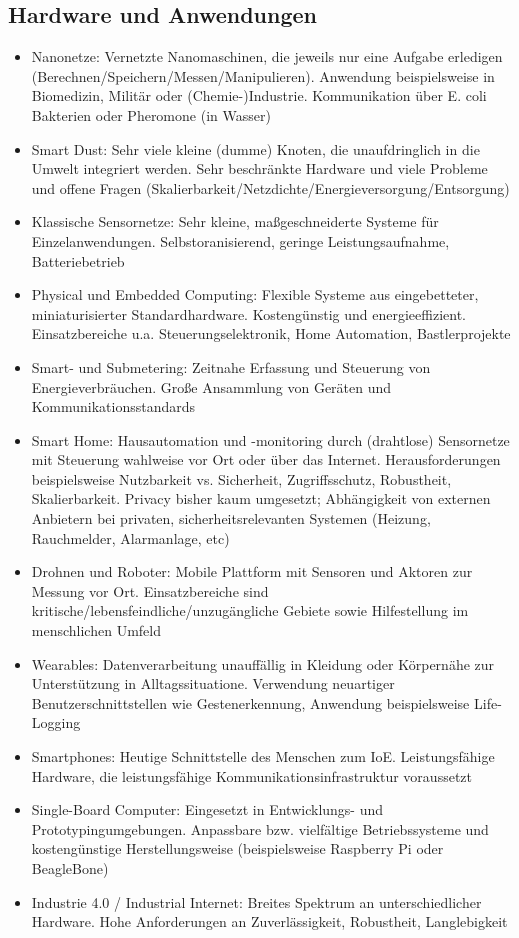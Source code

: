 \subsection{Hardware und Anwendungen}
\begin{itemize}
	\item Nanonetze: Vernetzte Nanomaschinen, die jeweils nur eine Aufgabe erledigen (Berechnen/Speichern/Messen/Manipulieren). Anwendung beispielsweise in Biomedizin, Militär oder (Chemie-)Industrie. Kommunikation über E. coli Bakterien oder Pheromone (in Wasser)
	\item Smart Dust: Sehr viele kleine (dumme) Knoten, die unaufdringlich in die Umwelt integriert werden. Sehr beschränkte Hardware und viele Probleme und offene Fragen (Skalierbarkeit/Netzdichte/Energieversorgung/Entsorgung)
	\item Klassische Sensornetze: Sehr kleine, maßgeschneiderte Systeme für Einzelanwendungen. Selbstoranisierend, geringe Leistungsaufnahme, Batteriebetrieb
	\item Physical und Embedded Computing: Flexible Systeme aus eingebetteter, miniaturisierter Standardhardware. Kostengünstig und energieeffizient. Einsatzbereiche u.a. Steuerungselektronik, Home Automation, Bastlerprojekte
	\item Smart- und Submetering: Zeitnahe Erfassung und Steuerung von Energieverbräuchen. Große Ansammlung von Geräten und Kommunikationsstandards
	\item Smart Home: Hausautomation und -monitoring durch (drahtlose) Sensornetze mit Steuerung wahlweise vor Ort oder über das Internet. Herausforderungen beispielsweise Nutzbarkeit vs. Sicherheit, Zugriffsschutz, Robustheit, Skalierbarkeit. Privacy bisher kaum umgesetzt; Abhängigkeit von externen Anbietern bei privaten, sicherheitsrelevanten Systemen (Heizung, Rauchmelder, Alarmanlage, etc)
	\item Drohnen und Roboter: Mobile Plattform mit Sensoren und Aktoren zur Messung vor Ort. Einsatzbereiche sind kritische/lebensfeindliche/unzugängliche Gebiete sowie Hilfestellung im menschlichen Umfeld
	\item Wearables: Datenverarbeitung unauffällig in Kleidung oder Körpernähe zur Unterstützung in Alltagssituatione. Verwendung neuartiger Benutzerschnittstellen wie Gestenerkennung, Anwendung beispielsweise Life-Logging
	\item Smartphones: Heutige Schnittstelle des Menschen zum IoE. Leistungsfähige Hardware, die leistungsfähige Kommunikationsinfrastruktur voraussetzt
	\item Single-Board Computer: Eingesetzt in Entwicklungs- und Prototypingumgebungen. Anpassbare bzw. vielfältige Betriebssysteme und kostengünstige Herstellungsweise (beispielsweise Raspberry Pi oder BeagleBone)
	\item Industrie 4.0 / Industrial Internet: Breites Spektrum an unterschiedlicher Hardware. Hohe Anforderungen an Zuverlässigkeit, Robustheit, Langlebigkeit
\end{itemize}


